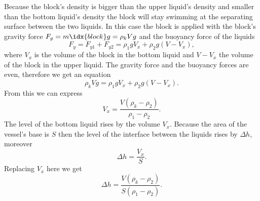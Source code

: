 \solueng
Because the block’s density is bigger than the upper liquid’s density and smaller than the bottom liquid’s density the block will stay swimming at the separating surface between the two liquids. In this case the block is applied with the block’s gravity force $F_g = m\idx{block}g=\rho_k Vg$ and the buoyancy force of the liquids 
\[ F_y=F_{y1}+F_{y2}=\rho_1gV_x + \rho_2g(V-V_x), \]
where $V_x$ is the volume of the block in the bottom liquid and $V-V_x$ the volume of the block in the upper liquid. The gravity force and the buoyancy forces are even, therefore we get an equation 
\[ \rho_k Vg = \rho_1gV_x + \rho_2g(V-V_x). \]
From this we can express
\[ V_x = \frac{V(\rho_k-\rho_2)}{\rho_1-\rho_2}. \]
The level of the bottom liquid rises by the volume $V_x$. Because the area of the vessel’s base is $S$ then the level of the interface between the liquids rises by $\Delta h$, moreover
\[ \Delta h = \frac{V_x}{S}. \]
Replacing $V_x$ here we get
\[ \Delta h = \frac{V(\rho_k-\rho_2)}{S(\rho_1-\rho_2)}. \]
\probend